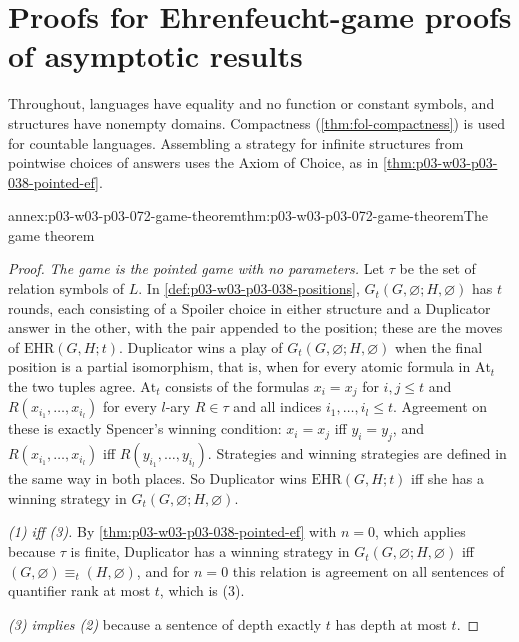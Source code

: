 \section{Proofs for Ehrenfeucht-game proofs of asymptotic results}
\label{sec:annex-p03-w03-p03-072-game-proofs}

Throughout, languages have equality and no function or constant symbols,
and structures have nonempty domains.  Compactness
(\cref{thm:fol-compactness}) is used for countable languages.  Assembling a
strategy for infinite structures from pointwise choices of answers uses the
Axiom of Choice, as in \cref{thm:p03-w03-p03-038-pointed-ef}.

\begin{annexitem}{annex:p03-w03-p03-072-game-theorem}{thm:p03-w03-p03-072-game-theorem}{The game theorem}
\begin{proof}
\emph{The game is the pointed game with no parameters.}  Let \(\tau\) be the
set of relation symbols of \(L\).  In \cref{def:p03-w03-p03-038-positions},
\(G_t(G,\varnothing;H,\varnothing)\) has \(t\) rounds, each consisting of a
Spoiler choice in either structure and a Duplicator answer in the other, with
the pair appended to the position; these are the moves of
\(\mathrm{EHR}(G,H;t)\).  Duplicator wins a play of
\(G_t(G,\varnothing;H,\varnothing)\) when the final position is a partial
isomorphism, that is, when for every atomic formula in \(\mathrm{At}_t\) the
two tuples agree.  \(\mathrm{At}_t\) consists of the formulas
\(x_i=x_j\) for \(i,j\leq t\) and \(R(x_{i_1},\ldots,x_{i_l})\) for every
\(l\)-ary \(R\in\tau\) and all indices \(i_1,\ldots,i_l\leq t\).  Agreement on
these is exactly Spencer's winning condition: \(x_i=x_j\) iff \(y_i=y_j\),
and \(R(x_{i_1},\ldots,x_{i_l})\) iff \(R(y_{i_1},\ldots,y_{i_l})\).
Strategies and winning strategies are defined in the same way in both
places.  So Duplicator wins \(\mathrm{EHR}(G,H;t)\) iff she has a winning
strategy in \(G_t(G,\varnothing;H,\varnothing)\).

\emph{(1) iff (3).}  By \cref{thm:p03-w03-p03-038-pointed-ef} with \(n=0\),
which applies because \(\tau\) is finite, Duplicator has a winning strategy
in \(G_t(G,\varnothing;H,\varnothing)\) iff
\((G,\varnothing)\equiv_t(H,\varnothing)\), and for \(n=0\) this relation is
agreement on all sentences of quantifier rank at most \(t\), which is (3).

\emph{(3) implies (2)} because a sentence of depth exactly \(t\) has depth at
most \(t\).


\end{proof}
\end{annexitem}
